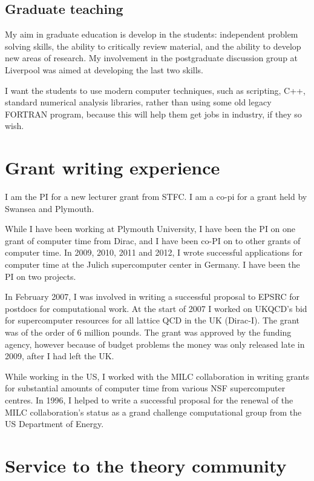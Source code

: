 \documentclass[12pt]{article}
\begin{document}
\subsection{Graduate teaching}

My aim in graduate education is develop in the students:
independent problem solving skills, 
the ability to critically review material, and 
the ability to develop new areas of research. My 
involvement in the postgraduate discussion group at Liverpool
was aimed at developing the last two skills.

I want the students to use modern computer
techniques, such as scripting, C++, standard numerical
analysis libraries, rather than using some old legacy
FORTRAN program, because this will help them 
get jobs in industry, if they so wish.


\section{Grant writing experience} 

I am the PI for  a new lecturer grant from STFC. I am
a co-pi for a grant held by Swansea and Plymouth.

While I have been working  at Plymouth University, I have been
the PI on one grant of computer time from Dirac, and I have been
co-PI on to other grants of computer time.
In 2009, 2010, 2011
and 2012,
I wrote successful applications for computer time at the Julich
supercomputer center in Germany. I have been the PI on two projects.

In February 2007, I was involved in writing a successful proposal to
EPSRC for postdocs for computational work.  At the start of 2007 I
worked on UKQCD's bid for supercomputer resources for all lattice QCD
in the UK (Dirac-I). The grant was of the order of 6 million
pounds. The grant was approved by the funding agency, however because
of budget problems the money was only released late in 2009, after I
had left the UK.


While working in the US,
I worked with the MILC collaboration in writing grants for
substantial amounts of computer time from various NSF supercomputer
centres. In 1996, I helped to write a successful proposal for the
renewal of the MILC collaboration's status as a grand challenge
computational group from the US Department of Energy. 


\section{Service to the theory community}
\end{document}
